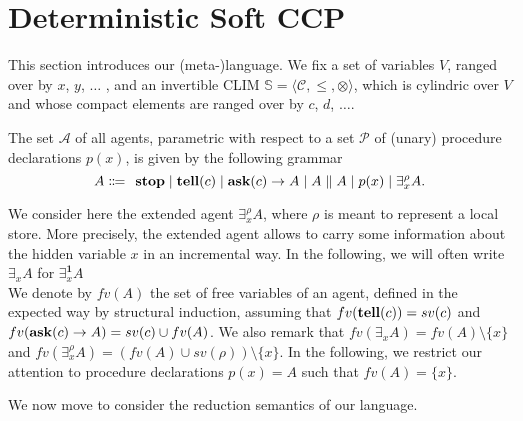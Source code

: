 \documentclass{llncs}
\newcommand{\tell}{{\bf tell}}
\newcommand{\ask}{{\bf ask}}
\newcommand{\ostop}{{\bf stop}}
\def\monid{{\mathbf 0}}
\def\monid{\mathbf{1}}
\begin{document}
\section{Deterministic Soft CCP}\label{sec:detSCCP}
This section introduces our (meta-)language.
We fix a set of variables $V$, ranged over by $x$, $y$, $\ldots$ , and 
an invertible CLIM $\mathbb S = \langle {\mathcal C}, \leq, \otimes\rangle$, which is 
cylindric over $V$ and whose compact elements
are ranged over by $c$, $d$, $\ldots$.

\begin{definition}[Agents]%
The set $\mathcal{A}$ of all agents, %
parametric with respect to a set $\mathcal{P}$ of (unary) procedure declarations $p(x)$,
is given by the following grammar
\[ A \Coloneqq \: \: \mathit{\ostop} \mid \textit{\tell}(c)  \mid \textit{\ask}(c) \rightarrow A \mid A \parallel A \mid %
p(x) \mid \exists^{\rho}_x A.\]  
\end{definition}

We consider here the extended agent $\exists^{\rho}_x A$, where $\rho$ is meant to represent a local store. More precisely, the extended agent allows to carry some information about the hidden variable $x$ in an incremental way. In the following, we will often write $\exists_x A$ for $\exists^{\monid}_x A$ \\
We denote by $fv(A)$ the set of free variables of an agent, defined in the expected way 
by structural induction, assuming that $fv(\tell(c)) = sv(c)$ and
$fv(\ask(c) \rightarrow A) = sv(c) \cup fv(A)$. We also remark that $fv(\exists_x A) = fv(A) \setminus 
\{x\}$ and $fv(\exists^{\rho}_x A) = (fv(A) \cup sv(\rho)) \setminus \{x\}$.
%
In the following, we restrict our attention to 
procedure declarations $p(x) = A$ such that $fv(A) = \{x\}$.

We now move to consider the reduction semantics of our language.
\end{document}
